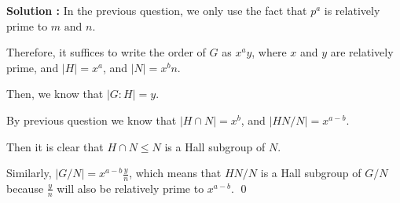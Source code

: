 \documentclass[11pt]{article}
\newcommand{\AND}{\text{ and }}
\newenvironment{solution}[1][\unskip]
	{\noindent \textbf{Solution #1:} }
	{\qed \pagebreak}
\begin{document}
\begin{solution}
	In the previous question, we only use the fact
	that $p^a$ is relatively prime to $m \AND n$.

	Therefore, it suffices to write the order of $G$ as $x^ay$,
	where $x$ and $y$ are relatively prime, and $|H| = x^a$,
	and $|N| = x^bn$.

	Then, we know that $|G:H| = y$.

	By previous question we know that $|H \cap N| = x^b$,
	and $|HN / N| = x^{a-b}$.

	Then it is clear that $H \cap N \leqslant N$ is a 
	Hall subgroup of $N$.

	Similarly, $|G / N| = x^{a-b} \frac{y}{n}$,
	which means that $HN / N$ is a Hall subgroup of $G / N$
	because $\frac{y}{n}$ will also be relatively prime to $x^{a-b}$.
\end{solution}
\end{document}
